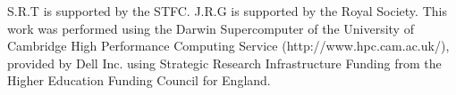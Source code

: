 \documentclass[prd,showpacs,nofootinbib]{revtex4}
\begin{document}







\FloatBarrier

\FloatBarrier

 



\begin{acknowledgments}
S.R.T is supported by the STFC. J.R.G is supported by the Royal Society. This work was performed using the Darwin Supercomputer of the University of Cambridge High Performance Computing Service (http://www.hpc.cam.ac.uk/), provided by Dell Inc. using Strategic Research Infrastructure Funding from the Higher Education Funding Council for England. 
\end{acknowledgments}


\end{document}
